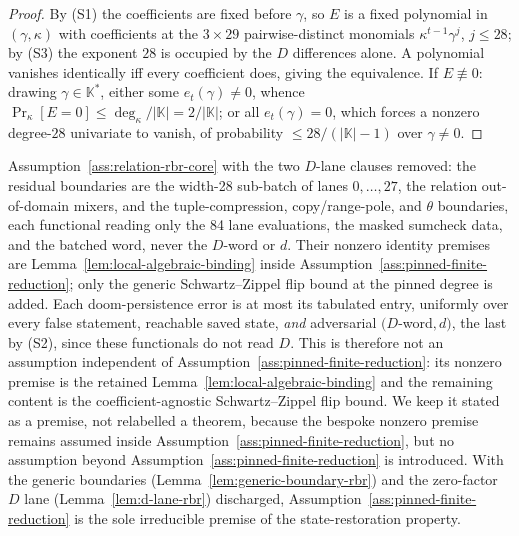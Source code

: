 \begin{proof}
By \textup{(S1)} the coefficients are fixed before \(\gamma\), so \(E\) is a
fixed polynomial in \((\gamma,\kappa)\) with coefficients at the \(3\times29\)
pairwise-distinct monomials \(\kappa^{t-1}\gamma^{j}\), \(j\le28\); by
\textup{(S3)} the exponent \(28\) is occupied by the \(D\) differences alone.
A polynomial vanishes identically iff every coefficient does, giving the
equivalence.  If \(E\not\equiv0\): drawing \(\gamma\in\mathbb K^{*}\), either
some \(e_t(\gamma)\ne0\), whence \(\Pr_\kappa[E=0]\le\deg_\kappa/|\mathbb K|
=2/|\mathbb K|\); or all \(e_t(\gamma)=0\), which forces a nonzero
degree-\(28\) univariate to vanish, of probability \(\le28/(|\mathbb K|-1)\)
over \(\gamma\ne0\).
\end{proof}

\begin{assumption}
\label{ass:relation-rbr-core-dfree}
Assumption~\ref{ass:relation-rbr-core} with the two \(D\)-lane clauses removed:
the residual boundaries are the width-28 sub-batch of lanes \(0,\dots,27\), the
relation out-of-domain mixers, and the tuple-compression, copy/range-pole, and
\(\theta\) boundaries, each functional reading only the 84 lane evaluations, the
masked sumcheck data, and the batched word, never the \(D\)-word or \(d\).
Their nonzero identity premises are Lemma~\ref{lem:local-algebraic-binding}
inside Assumption~\ref{ass:pinned-finite-reduction}; only the generic
Schwartz--Zippel flip bound at the pinned degree is added.  Each doom-persistence
error is at most its tabulated entry, uniformly over every false statement,
reachable saved state, \emph{and} adversarial \((D\)-word\(,d)\), the last by
\textup{(S2)}, since these functionals do not read \(D\).  This is therefore not
an assumption independent of Assumption~\ref{ass:pinned-finite-reduction}: its
nonzero premise is the retained Lemma~\ref{lem:local-algebraic-binding} and the
remaining content is the coefficient-agnostic Schwartz--Zippel flip bound.  We
keep it stated as a premise, not relabelled a theorem, because the
bespoke nonzero premise remains assumed inside
Assumption~\ref{ass:pinned-finite-reduction}, but no assumption beyond
Assumption~\ref{ass:pinned-finite-reduction} is introduced.  With the generic
boundaries (Lemma~\ref{lem:generic-boundary-rbr}) and the zero-factor \(D\) lane
(Lemma~\ref{lem:d-lane-rbr}) discharged, Assumption~\ref{ass:pinned-finite-reduction}
is the sole irreducible premise of the state-restoration property.
\end{assumption}

